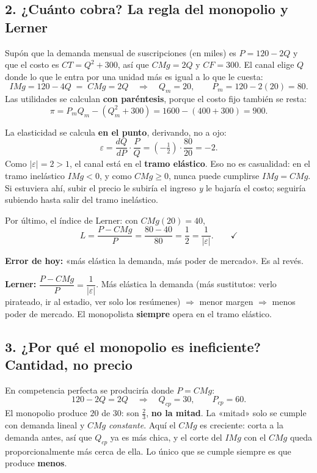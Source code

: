 \documentclass[11pt]{article}
\begin{document}
\subsection*{2. ¿Cuánto cobra? La regla del monopolio y Lerner}

Supón que la demanda mensual de suscripciones (en miles) es $P = 120 - 2Q$ y que el costo es $CT = Q^{2} + 300$, así que $CMg = 2Q$ y $CF = 300$. El canal elige $Q$ donde lo que le entra por una unidad más es igual a lo que le cuesta:
\[
IMg = 120 - 4Q \;=\; CMg = 2Q \quad\Longrightarrow\quad Q_m = 20,\qquad P_m = 120 - 2(20) = 80.
\]
Las utilidades se calculan \textbf{con paréntesis}, porque el costo fijo también se resta:
\[
\pi = P_m Q_m - \left(Q_m^{2} + 300\right) = 1600 - (400 + 300) = 900.
\]

La elasticidad se calcula \textbf{en el punto}, derivando, no a ojo:
\[
\varepsilon = \frac{dQ}{dP}\cdot\frac{P}{Q} = \left(-\tfrac12\right)\cdot\frac{80}{20} = -2 .
\]
Como $|\varepsilon| = 2 > 1$, el canal está en el \textbf{tramo elástico}. Eso no es casualidad: en el tramo inelástico $IMg < 0$, y como $CMg \geq 0$, nunca puede cumplirse $IMg = CMg$. Si estuviera ahí, subir el precio le subiría el ingreso \emph{y} le bajaría el costo; seguiría subiendo hasta salir del tramo inelástico.

Por último, el índice de Lerner: con $CMg(20) = 40$,
\[
L = \frac{P - CMg}{P} = \frac{80 - 40}{80} = \frac12 = \frac{1}{|\varepsilon|}. \qquad\checkmark
\]

\begin{error}
\textbf{Error de hoy:} «más elástica la demanda, más poder de mercado». Es al revés.
\end{error}
\begin{clave}
\textbf{Lerner:} $\dfrac{P - CMg}{P} = \dfrac{1}{|\varepsilon|}$. Más elástica la demanda (más sustitutos: verlo pirateado, ir al estadio, ver solo los resúmenes) $\Rightarrow$ menor margen $\Rightarrow$ menos poder de mercado. El monopolista \textbf{siempre} opera en el tramo elástico.
\end{clave}

\subsection*{3. ¿Por qué el monopolio es ineficiente? Cantidad, no precio}

En competencia perfecta se produciría donde $P = CMg$:
\[
120 - 2Q = 2Q \quad\Longrightarrow\quad Q_{cp} = 30,\qquad P_{cp} = 60.
\]
El monopolio produce $20$ de $30$: son $\tfrac{2}{3}$, \textbf{no la mitad}. La «mitad» solo se cumple con demanda lineal y $CMg$ \emph{constante}. Aquí el $CMg$ es creciente: corta a la demanda antes, así que $Q_{cp}$ ya es más chica, y el corte del $IMg$ con el $CMg$ queda proporcionalmente más cerca de ella. Lo único que se cumple siempre es que produce \textbf{menos}.
\end{document}
